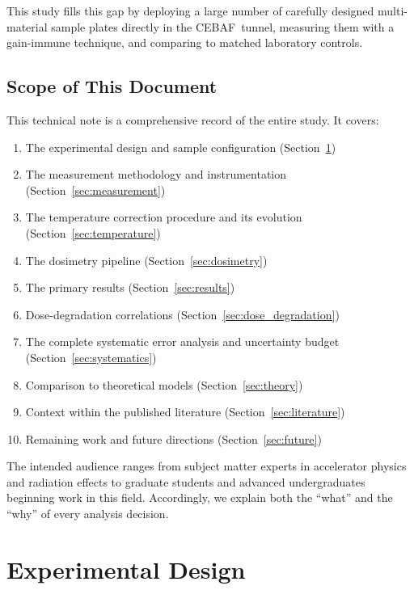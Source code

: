 \documentclass[11pt,letterpaper]{article}
\newcommand{\CEBAF}{CEBAF}
\begin{document}
This study fills this gap by deploying a large number of carefully designed
multi-material sample plates directly in the \CEBAF~tunnel, measuring them with
a gain-immune technique, and comparing to matched laboratory controls.

\subsection{Scope of This Document}

This technical note is a comprehensive record of the entire study. It covers:

\begin{enumerate}
    \item The experimental design and sample configuration (Section~\ref{sec:design})
    \item The measurement methodology and instrumentation (Section~\ref{sec:measurement})
    \item The temperature correction procedure and its evolution (Section~\ref{sec:temperature})
    \item The dosimetry pipeline (Section~\ref{sec:dosimetry})
    \item The primary results (Section~\ref{sec:results})
    \item Dose-degradation correlations (Section~\ref{sec:dose_degradation})
    \item The complete systematic error analysis and uncertainty budget (Section~\ref{sec:systematics})
    \item Comparison to theoretical models (Section~\ref{sec:theory})
    \item Context within the published literature (Section~\ref{sec:literature})
    \item Remaining work and future directions (Section~\ref{sec:future})
\end{enumerate}

The intended audience ranges from subject matter experts in accelerator physics
and radiation effects to graduate students and advanced undergraduates beginning
work in this field. Accordingly, we explain both the ``what'' and the ``why'' of
every analysis decision.

\section{Experimental Design}
\label{sec:design}
\end{document}
